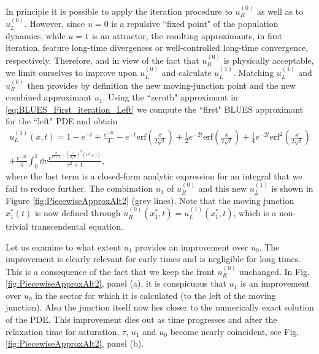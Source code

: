 \documentclass[amsmath,amssymb,amsfonts,aps,pre,preprint,superscriptaddress,showpacs,showkeys,longbibliography,nofootinbib]{revtex4-1}
\begin{document}
In principle it is possible to apply the iteration procedure to $u^{(0)}_R$ as well as to $u^{(0)}_L$. However, since $u=0$ is a repulsive ``fixed point" of the population dynamics, while $u=1$ is an attractor, the resulting approximants, in first iteration, feature long-time divergences or well-controlled long-time convergence, respectively. Therefore, and in view of the fact that $u^{(0)}_R$ is physically acceptable, we limit ourselves to improve upon $u^{(0)}_L$ and calculate $u^{(1)}_L$. Matching $u^{(1)}_L$ and $u^{(0)}_R$ then provides by definition the new moving-junction point and the new combined approximant $u_1$.  Using the ``zeroth" approximant in \eqref{eq:BLUES_First_iteration_Left} we compute the ``first" BLUES approximant for the ``left" PDE and obtain 
\begin{multline}\label{eq:BLUES_First_iteration_Left}
    u^{(1)}_L(x,t)=1-e^{-t}+\frac{e^{-2 t}}{4}-e^{-t}\text{erf}\left(\frac{x}{2 \sqrt{t}}\right)+\frac{1}{2} e^{-2 t} \text{erf}\left(\frac{x}{2 \sqrt{t}}\right)  +\frac{1}{4} e^{-2 t} \text{erf}^2\left(\frac{x}{2 \sqrt{t}}\right)\\
    +\frac{e^{-3 t}}{\pi } \int_0^1 \dd{v}
    \frac{e^{\frac{2 t }{v^2+1}-\left(\frac{x}{2 \sqrt{t}}\right)^2\left(v^2+1\right) }}{v^2+1},
\end{multline}
where the last term is a closed-form analytic expression for an integral that we fail to reduce further. The combination $u_1$ of $u^{(0)}_R$ and this new $u^{(1)}_L$ is shown in Figure \ref{fig:PiecewiseApproxAlt2} (grey lines). Note that the moving junction $x^*_1 (t)$ is now defined through $u^{(0)}_R(x^*_1,t)=u^{(1)}_L(x^*_1,t)$, which is a non-trivial transcendental equation. 

Let us examine to what extent $u_1$ provides an improvement over $u_0$. The improvement is clearly relevant for early times and is negligible for long times. This is a consequence of the fact that we keep the front $u^{(0)}_R$ unchanged. In Fig. \ref{fig:PiecewiseApproxAlt2}, panel (a),
it is conspicuous that $u_1$ is an improvement over $u_0$ in the sector for which it is calculated (to the left of the moving junction). Also the junction itself now lies closer to the numerically exact solution of the PDE. This improvement dies out as time progresses and after the relaxation time for saturation, $\tau$, $u_1$ and $u_0$ become nearly coincident, see Fig. \ref{fig:PiecewiseApproxAlt2}, panel (b). 
\end{document}
